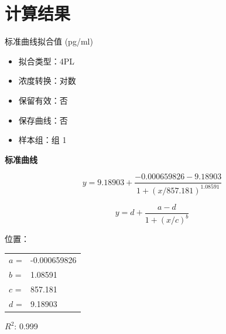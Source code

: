 \documentclass[UTF8,10pt,a4paper,fontset=fandol]{ctexart}
\newcommand{\fieldvalue}[1]{#1}
\begin{document}
\section*{计算结果}

标准曲线拟合值 (pg/ml)

\begin{itemize}
\item
拟合类型：\fieldvalue{4PL}
\item
浓度转换：\fieldvalue{对数}
\item
保留有效：\fieldvalue{否}
\item
保存曲线：\fieldvalue{否}
\item
样本组：\fieldvalue{组 1}
\end{itemize}

\begin{center}
\textbf{标准曲线}

\end{center}

\[
y=9.18903+
\frac{-0.000659826-9.18903}
{1+\left(x/857.181\right)^{1.08591}}
\]

\newpage

\[
y = d + \frac{a-d}{1+(x/c)^b}
\]

位置：

\begin{tabular}{ll}
$a$ = &
\fieldvalue{-0.000659826} \\
$b$ = &
\fieldvalue{1.08591} \\
$c$ = &
\fieldvalue{857.181} \\
$d$ = &
\fieldvalue{9.18903}
\end{tabular}

$R^2$:
\fieldvalue{0.999}

\bigskip
\end{document}
